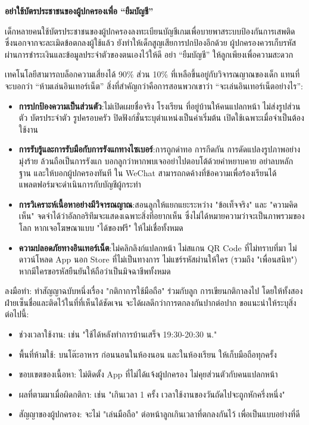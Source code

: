 \textbf{อย่าใช้บัตรประชาชนของผู้ปกครองเพื่อ “ยืมบัญชี”}\par

เด็กหลายคนใช้บัตรประชาชนของผู้ปกครองลงทะเบียนบัญชีเกมเพื่อบายพาสระบบป้องกันการเสพติด ซึ่งนอกจากจะละเมิดข้อตกลงผู้ใช้แล้ว ยังทำให้เด็กสูญเสียการปกป้องอีกด้วย ผู้ปกครองควรเก็บรหัสผ่านการชำระเงินและข้อมูลประจำตัวของตนเองไว้ให้ดี อย่า “ยืมบัญชี” ให้ลูกเพียงเพื่อความสะดวก


เทคโนโลยีสามารถบล็อกความเสี่ยงได้ 90\% ส่วน 10\% ที่เหลือขึ้นอยู่กับวิจารณญาณของเด็ก แทนที่จะบอกว่า “ห้ามเล่นอินเทอร์เน็ต” สิ่งที่สำคัญกว่าคือการสอนพวกเขาว่า “จะเล่นอินเทอร์เน็ตอย่างไร”:

\begin{itemize}
  \item \textbf{การปกป้องความเป็นส่วนตัว}:ไม่เปิดเผยชื่อจริง โรงเรียน ที่อยู่บ้านให้คนแปลกหน้า ไม่ส่งรูปส่วนตัว บัตรประจำตัว รูปครอบครัว ปิดฟังก์ชั่นระบุตำแหน่งเป็นค่าเริ่มต้น เปิดใช้เฉพาะเมื่อจำเป็นต้องใช้งาน
  \item \textbf{การรับรู้และการรับมือกับการรังแกทางไซเบอร์}:การถูกด่าทอ การกีดกัน การดัดแปลงรูปภาพอย่างมุ่งร้าย ล้วนถือเป็นการรังแก บอกลูกว่าหากพบเจออย่าไปตอบโต้ด้วยคำหยาบคาย อย่าลบหลักฐาน และให้บอกผู้ปกครองทันที ใน WeChat สามารถกดค้างที่ข้อความเพื่อร้องเรียนได้ แพลตฟอร์มจะดำเนินการกับบัญชีผู้กระทำ
  \item \textbf{การวิเคราะห์เนื้อหาอย่างมีวิจารณญาณ}:สอนลูกให้แยกแยะระหว่าง "ข้อเท็จจริง" และ "ความคิดเห็น" จดจำได้ว่าอัลกอริทึมจะแสดงเฉพาะสิ่งที่อยากเห็น ซึ่งไม่ได้หมายความว่าจะเป็นภาพรวมของโลก หากเจอโฆษณาแบบ "ได้ของฟรี" ให้ไม่เชื่อทั้งหมด
  \item \textbf{ความปลอดภัยทางอินเทอร์เน็ต}:ไม่คลิกลิงก์แปลกหน้า ไม่สแกน QR Code ที่ไม่ทราบที่มา ไม่ดาวน์โหลด App นอก Store ที่ไม่เป็นทางการ ไม่แชร์รหัสผ่านให้ใคร (รวมถึง "เพื่อนสนิท") หากมีใครขอรหัสยืนยันให้ถือว่าเป็นมิจฉาชีพทั้งหมด
\end{itemize}

\begin{tcbpractice}{ลงมือทำ: ทำสัญญาฉบับหนึ่งเรื่อง "กติกาการใช้มือถือ" ร่วมกับลูก}
การเขียนกติกาลงไป โดยให้ทั้งสองฝ่ายเซ็นชื่อและติดไว้ในที่ที่เห็นได้ชัดเจน จะได้ผลดีกว่าการตกลงกันปากต่อปาก ขอแนะนำให้ระบุสิ่งต่อไปนี้:

\begin{itemize}
  \item ช่วงเวลาใช้งาน: เช่น "ใช้ได้หลังทำการบ้านเสร็จ 19:30-20:30 น."
  \item พื้นที่ห้ามใช้: บนโต๊ะอาหาร ก่อนนอนในห้องนอน และในห้องเรียน ให้เก็บมือถือทุกครั้ง
  \item ขอบเขตของเนื้อหา: ไม่ติดตั้ง App ที่ไม่ได้แจ้งผู้ปกครอง ไม่คุยส่วนตัวกับคนแปลกหน้า
  \item ผลที่ตามมาเมื่อผิดกติกา: เช่น "เกินเวลา 1 ครั้ง เวลาใช้งานของวันถัดไปจะถูกหักครึ่งหนึ่ง"
  \item สัญญาของผู้ปกครอง: จะไม่ "เล่นมือถือ" ต่อหน้าลูกเกินเวลาที่ตกลงกันไว้ เพื่อเป็นแบบอย่างที่ดี
\end{itemize}

\end{tcbpractice}

